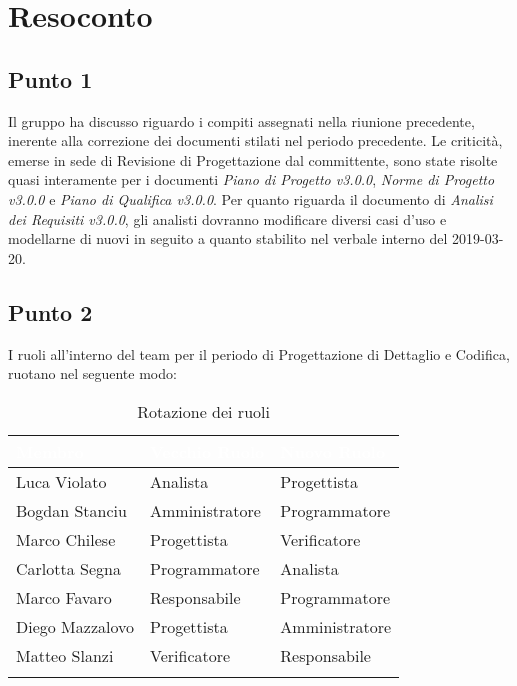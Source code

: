 \section{Resoconto}

\subsection{Punto 1}
Il gruppo ha discusso riguardo i compiti assegnati nella riunione precedente, inerente alla correzione dei documenti stilati nel periodo precedente. Le criticità, emerse in sede di Revisione di Progettazione dal committente, sono state risolte quasi interamente per i documenti \textit{Piano di Progetto v3.0.0}, \textit{Norme di Progetto v3.0.0} e \textit{Piano di Qualifica v3.0.0}. Per quanto riguarda il documento di \textit{Analisi dei Requisiti v3.0.0}, gli analisti dovranno modificare diversi casi d'uso e modellarne di nuovi in seguito a quanto stabilito nel verbale interno del 2019-03-20.
\\

\subsection{Punto 2}
I ruoli all'interno del team per il periodo di Progettazione di Dettaglio e Codifica, ruotano nel seguente modo:\\

\begin{center}
	\begin{longtable}[c]{|m{}|m{}|m{}|} 
		\hline
		\rowcolor{bluelogo}\textbf{\textcolor{white}{Membro}} & \textbf{\textcolor{white}{Vecchio Ruolo}} & \textbf{\textcolor{white}{Nuovo Ruolo}}\\
		\hline
		\hline
		Luca Violato & Analista & Progettista \\
		\hline
		\rowcolor{grigio}Bogdan Stanciu & Amministratore & Programmatore \\
		\hline
		Marco Chilese & Progettista & Verificatore\\
		\hline
		\rowcolor{grigio}Carlotta Segna & Programmatore & Analista\\
		\hline
		Marco Favaro & Responsabile & Programmatore \\
		\hline
		\rowcolor{grigio} Diego Mazzalovo & Progettista & Amministratore\\
		\hline
		Matteo Slanzi & Verificatore & Responsabile\\
		\hline
		\caption{Rotazione dei ruoli}
	\end{longtable}

\end{center}
	
